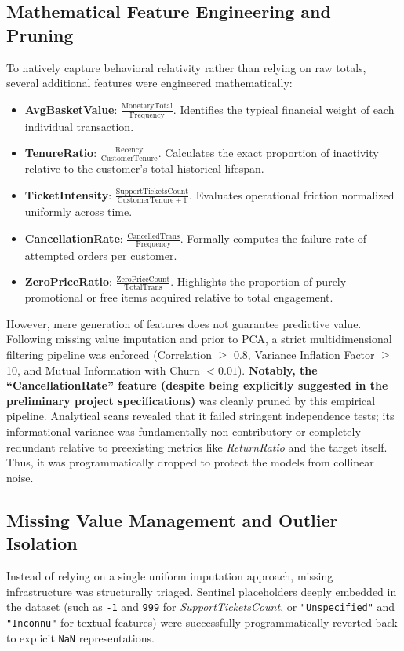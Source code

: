 \documentclass[11pt,a4paper]{article}
\begin{document}
\subsection{Mathematical Feature Engineering and Pruning}
To natively capture behavioral relativity rather than relying on raw totals, several additional features were engineered mathematically:
\begin{itemize}
    \item \textbf{AvgBasketValue}: $\frac{\text{MonetaryTotal}}{\text{Frequency}}$. Identifies the typical financial weight of each individual transaction.
    \item \textbf{TenureRatio}: $\frac{\text{Recency}}{\text{CustomerTenure}}$. Calculates the exact proportion of inactivity relative to the customer's total historical lifespan.
    \item \textbf{TicketIntensity}: $\frac{\text{SupportTicketsCount}}{\text{CustomerTenure} + 1}$. Evaluates operational friction normalized uniformly across time.
    \item \textbf{CancellationRate}: $\frac{\text{CancelledTrans}}{\text{Frequency}}$. Formally computes the failure rate of attempted orders per customer.
    \item \textbf{ZeroPriceRatio}: $\frac{\text{ZeroPriceCount}}{\text{TotalTrans}}$. Highlights the proportion of purely promotional or free items acquired relative to total engagement.
\end{itemize}

However, mere generation of features does not guarantee predictive value. Following missing value imputation and prior to PCA, a strict multidimensional filtering pipeline was enforced (Correlation $\ge$ 0.8, Variance Inflation Factor $\ge$ 10, and Mutual Information with Churn $< 0.01$). 
\textbf{Notably, the ``CancellationRate'' feature (despite being explicitly suggested in the preliminary project specifications)} was cleanly pruned by this empirical pipeline. Analytical scans revealed that it failed stringent independence tests; its informational variance was fundamentally non-contributory or completely redundant relative to preexisting metrics like \textit{ReturnRatio} and the target itself. Thus, it was programmatically dropped to protect the models from collinear noise.

\subsection{Missing Value Management and Outlier Isolation}
Instead of relying on a single uniform imputation approach, missing infrastructure was structurally triaged. Sentinel placeholders deeply embedded in the dataset (such as \texttt{-1} and \texttt{999} for \textit{SupportTicketsCount}, or \texttt{"Unspecified"} and \texttt{"Inconnu"} for textual features) were successfully programmatically reverted back to explicit \texttt{NaN} representations. 
\end{document}
